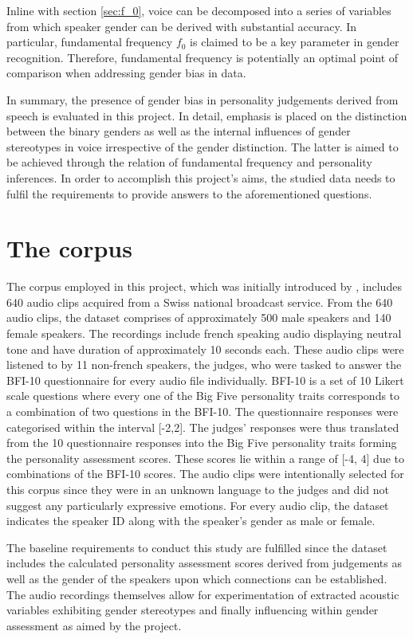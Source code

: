 \documentclass{l4proj}
\begin{document}
Inline with section \ref{sec:f_0}, voice can be decomposed into a series of variables from which speaker gender can be derived with substantial accuracy. In particular, fundamental frequency $f_0$ is claimed to be a key parameter in gender recognition. Therefore, fundamental frequency is potentially an optimal point of comparison when addressing gender bias in data.

In summary, the presence of gender bias in personality judgements derived from speech is evaluated in this project. In detail, emphasis is placed on the distinction between the binary genders as well as the internal influences of gender stereotypes in voice irrespective of the gender distinction. The latter is aimed to be achieved through the relation of fundamental frequency and personality inferences.
In order to accomplish this project’s aims, the studied data needs to fulfil the requirements to provide answers to the aforementioned questions.

\section{The corpus}
\label{sec:corpus}
The corpus employed in this project, which was initially introduced by \citet{Mohammadi2012}, includes 640 audio clips acquired from a Swiss national broadcast service. From the 640 audio clips, the dataset comprises of approximately 500 male speakers and 140 female speakers.
The recordings include french speaking audio displaying neutral tone and have duration of approximately 10 seconds each. These audio clips were listened to by 11 non-french speakers, the judges, who were tasked to answer the BFI-10 questionnaire \citep{Rammstedt2007} for every audio file individually. BFI-10 is a set of 10 Likert scale questions where every one of the Big Five personality traits corresponds to a combination of two questions in the BFI-10. The questionnaire responses were categorised within the interval [-2,2]. The judges’ responses were thus translated from the 10 questionnaire responses into the Big Five personality traits forming the personality assessment scores. These scores lie within a range of [-4, 4] due to combinations of the BFI-10 scores.
The audio clips were intentionally selected for this corpus since they were in an unknown language to the judges and did not suggest any particularly expressive emotions.
For every audio clip, the dataset indicates the speaker ID along with the speaker’s gender as male or female.

The baseline requirements to conduct this study are fulfilled since the dataset includes the calculated personality assessment scores derived from judgements as well as the gender of the speakers upon which connections can be established. The audio recordings themselves allow for experimentation of extracted acoustic variables exhibiting gender stereotypes and finally influencing within gender assessment as aimed by the project. 
\end{document}
